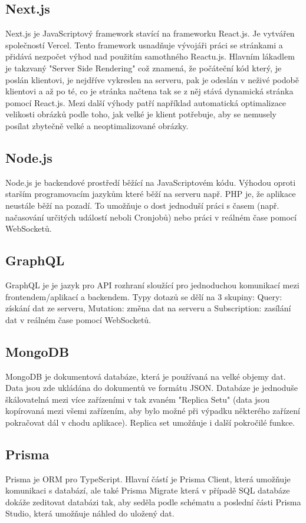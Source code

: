 \subsection{Next.js}
Next.js je JavaScriptový framework stavící na frameworku React.js. Je vytvářen společností Vercel. Tento framework usnadňuje vývojáři práci se stránkami a přidává nezpočet výhod nad použitím samothného Reactu.js. Hlavním lákadlem je takzvaný "Server Side Rendering" což znamená, že počáteční kód který, je poslán klientovi, je nejdříve vykreslen na serveru, pak je odeslán v neživé podobě klientovi a až po té, co je stránka načtena tak se z něj stává dynamická stránka pomocí React.js. Mezi další výhody patří například automatická optimalizace velikosti obrázků podle toho, jak velké je klient potřebuje, aby se nemusely posílat zbytečně velké a neoptimalizované obrázky.

\subsection{Node.js}
Node.js je backendové prostředí běžící na JavaScriptovém kódu. Výhodou oproti starším programovacím jazykům které běží na serveru např. PHP je, že aplikace neustále běží na pozadí. To umožňuje o dost jednoduší práci s časem (např. načasování určitých událostí neboli Cronjobů) nebo práci v reálném čase pomocí WebSocketů.

\subsection{GraphQL}
GraphQL je je jazyk pro API rozhraní sloužící pro jednoduchou komunikací mezi frontendem/aplikací a backendem. Typy dotazů se dělí na 3 skupiny: Query: získání dat ze serveru, Mutation: změna dat na serveru a Subscription: zasílání dat v reálném čase pomocí WebSocketů.

\subsection{MongoDB}
MongoDB je dokumentová databáze, která je používaná na velké objemy dat. Data jsou zde ukládána do dokumentů ve formátu JSON. Databáze je jednoduše škálovatelná mezi více zařízeními v tak zvaném "Replica Setu" (data jsou kopírovaná mezi všemi zařízením, aby bylo možné při výpadku některého zařízení pokračovat dál v chodu aplikace). Replica set umožňuje i další pokročilé funkce.

\subsection{Prisma}
Prisma je ORM pro TypeScript. Hlavní částí je Prisma Client, která umožňuje komunikaci s databází, ale také Prisma Migrate která v případě SQL databáze dokáže zeditovat databázi tak, aby seděla podle schématu a poslední části Prisma Studio, která umožňuje náhled do uložený dat.\cite{Prisma}

